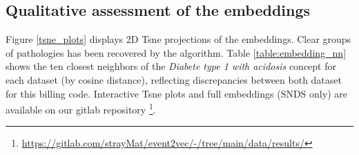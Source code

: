 \documentclass[french,12pt,twoside,a4paper]{book}
\begin{document}
\begin{appendices}
  \subsection{Qualitative assessment of the embeddings}

  Figure \ref{tsne_plots} displays 2D Tsne projections \cite{van2008visualizing}
  of the embeddings. Clear groups of pathologies has been recovered by the
  algorithm. Table \ref{table:embedding_nn} shows the ten closest neighbors of the
  \textit{Diabete type 1 with acidosis} concept for each dataset (by cosine
  distance), reflecting discrepancies between both dataset for this billing code.
  Interactive Tsne plots and full embeddings (SNDS only) are available on our
  gitlab repository
  \footnote{\url{https://gitlab.com/strayMat/event2vec/-/tree/main/data/results/}}.


\end{appendices}
\end{document}
